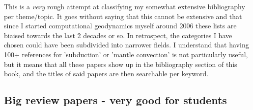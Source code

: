 This is a {\it very} rough attempt at classifying my somewhat extensive 
bibliography per theme/topic.
It goes without saying that this cannot be extensive and that since I 
started computational geodynamics myself around 2006 these lists are 
biaised towards the last 2 decades or so. 
In retrospect, the categories I have chosen could have been subdivided
into narrower fields. I understand that having 100+ references 
for 'subduction'  or 'mantle convection' is not particularly useful, 
but it means that all these papers show up in the bibliography section 
of this book, and the titles of said papers are then searchable per keyword.

\subsection*{Big review papers - very good for students}

